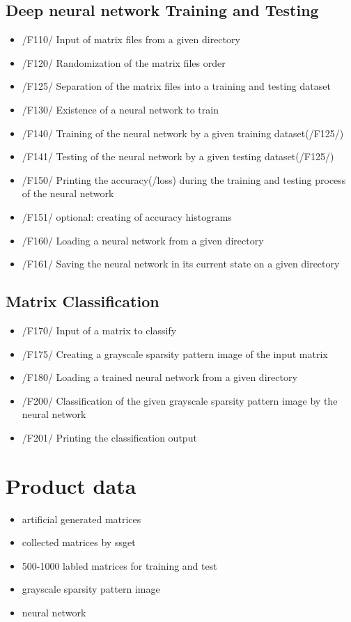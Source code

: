 \documentclass[parskip=full]{scrartcl}
\begin{document}
\subsection{Deep \gls{neural network} Training and Testing}
	\begin{itemize}
	\item /F110/ Input of matrix files from a given directory
	\item /F120/ Randomization of the matrix files order
	\item /F125/ Separation of the matrix files into a training and testing dataset
	\item /F130/ Existence of a \gls{neural network} to train
	\item /F140/ Training of the \gls{neural network} by a given training dataset(/F125/)
	\item /F141/ Testing of the \gls{neural network} by a given testing dataset(/F125/)
	\item /F150/ Printing the accuracy(/loss) during the training and testing process of the \gls{neural network}
	\item /F151/ optional: creating of accuracy histograms
	\item /F160/ Loading a \gls{neural network} from a given directory
	\item /F161/ Saving the \gls{neural network} in its current state on a given directory
	\end{itemize}
 	
\subsection{Matrix Classification}
	\begin{itemize}
	\item /F170/ Input of a matrix to classify
	\item /F175/ Creating a \gls{grayscale sparsity pattern image} of the input matrix
	\item /F180/ Loading a trained \gls{neural network} from a given directory
	\item /F200/ Classification of the given \gls{grayscale sparsity pattern image} by the \gls{neural network}
	\item /F201/ Printing the classification output
	\end{itemize}

\section{Product data}
	\begin{itemize}
	\item artificial generated matrices
	\item collected matrices by \gls{ssget}
	\item 500-1000 labled matrices for training and test
	\item \gls{grayscale sparsity pattern image}
	\item \gls{neural network}

	\end{itemize}
\end{document}
